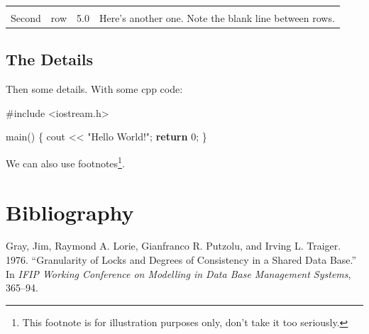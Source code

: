 \documentclass[]{article}
\newenvironment{Shaded}{\begin{snugshade}}{\end{snugshade}}
\newcommand{\KeywordTok}[1]{\textcolor[rgb]{0.13,0.29,0.53}{\textbf{{#1}}}}
\newcommand{\DecValTok}[1]{\textcolor[rgb]{0.00,0.00,0.81}{{#1}}}
\newcommand{\StringTok}[1]{\textcolor[rgb]{0.31,0.60,0.02}{{#1}}}
\newcommand{\OtherTok}[1]{\textcolor[rgb]{0.56,0.35,0.01}{{#1}}}
\newcommand{\NormalTok}[1]{{#1}}
\begin{document}
\begin{longtable}[c]{@{}clrl@{}}
\begin{minipage}[t]{0.31\columnwidth}
\strut\end{minipage}\tabularnewline
\begin{minipage}[t]{0.15\columnwidth}\centering\strut
Second
\strut\end{minipage} &
\begin{minipage}[t]{0.10\columnwidth}\raggedright\strut
row
\strut\end{minipage} &
\begin{minipage}[t]{0.20\columnwidth}\raggedleft\strut
5.0
\strut\end{minipage} &
\begin{minipage}[t]{0.31\columnwidth}\raggedright\strut
Here's another one. Note the blank line between rows.
\strut\end{minipage}\tabularnewline
\bottomrule
\end{longtable}

\subsection{The Details}\label{the-details}

Then some details. With some cpp code:

\begin{Shaded}
\begin{Highlighting}[]
\OtherTok{#include <iostream.h>}

\NormalTok{main()}
\NormalTok{\{}
    \NormalTok{cout << }\StringTok{"Hello World!"}\NormalTok{;}
    \KeywordTok{return} \DecValTok{0}\NormalTok{;}
\NormalTok{\}}
\end{Highlighting}
\end{Shaded}

We can also use footnotes\footnote{This footnote is for illustration
  purposes only, don't take it too seriously.}.

\section{Bibliography}\label{bibliography}

\noindent
\vspace{-2em} \setlength{\parindent}{-0.26in}
\setlength{\leftskip}{0.2in} \setlength{\parskip}{8pt}

Gray, Jim, Raymond A. Lorie, Gianfranco R. Putzolu, and Irving L.
Traiger. 1976. ``Granularity of Locks and Degrees of Consistency in a
Shared Data Base.'' In \emph{IFIP Working Conference on Modelling in
Data Base Management Systems}, 365--94.
\end{document}
